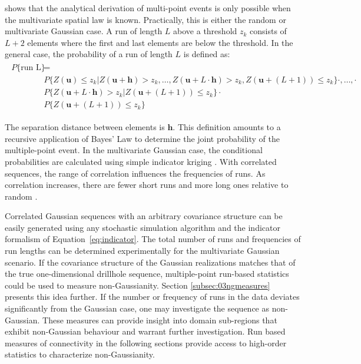 \cite{ortiz2003characterization} shows that the analytical derivation of multi-point events is only possible when the multivariate spatial law is known. Practically, this is either the random or multivariate Gaussian case. A run of length $L$ above a threshold $z_{k}$ consists of $L+2$ elements where the first and last elements are below the threshold. In the general case, the probability of a run of length $L$ is defined as:
\begin{align}
    \begin{split}
        P\{\text{run L}\} & =                                                                                                                                                                \\
                          & P\{Z(\mathbf{u}) \leq z_{k}| Z(\mathbf{u + h}) > z_{k},\dots, Z(\mathbf{u} + L \cdot \mathbf{h}) > z_{k}, Z(\mathbf{u} + (L+1)) \leq z_{k}\} \cdot ,\dots, \cdot \\
                          & P\{Z(\mathbf{u} + L \cdot \mathbf{h}) > z_{k} | Z(\mathbf{u} + (L+1)) \leq z_{k}\} \cdot                                                                         \\
                          & P\{Z(\mathbf{u} + (L+1)) \leq z_{k}\}
    \end{split}
\end{align}

The separation distance between elements is $\mathbf{h}$. This definition amounts to a recursive application of Bayes' Law to determine the joint probability of the multiple-point event. In the multivariate Gaussian case, the conditional probabilities are calculated using simple indicator kriging \citep{journel1989nongaussian}. With correlated sequences, the range of correlation influences the frequencies of runs. As correlation increases, there are fewer short runs and more long ones relative to random \citep{ortiz2003characterization}.

Correlated Gaussian sequences with an arbitrary covariance structure can be easily generated using any stochastic simulation algorithm and the indicator formalism of Equation~\ref{eq:indicator}. The total number of runs and frequencies of run lengths can be determined experimentally for the multivariate Gaussian scenario. If the covariance structure of the Gaussian realizations matches that of the true one-dimensional drillhole sequence, multiple-point run-based statistics could be used to measure non-Gaussianity. Section \ref{subsec:03ngmeasures} presents this idea further. If the number or frequency of runs in the data deviates significantly from the Gaussian case, one may investigate the sequence as non-Gaussian. These measures can provide insight into domain sub-regions that exhibit non-Gaussian behaviour and warrant further investigation. Run based measures of connectivity in the following sections provide access to high-order statistics to characterize non-Gaussianity.

